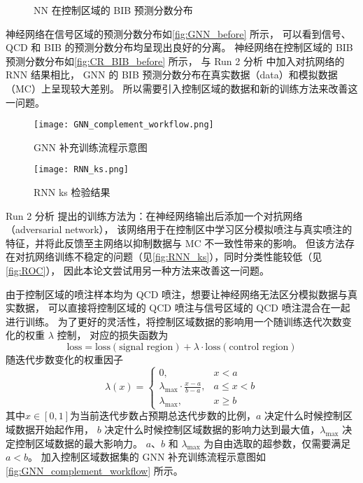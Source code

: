 \begin{figure}[ht]
    \centering
    \hfill
    \caption{NN 在控制区域的 BIB 预测分数分布}
    \label{fig:CR_BIB_before}
\end{figure}

神经网络在信号区域的预测分数分布如\autoref{fig:GNN_before} 所示，
可以看到信号、QCD 和 BIB 的预测分数分布均呈现出良好的分离。
神经网络在控制区域的 BIB 预测分数分布如\autoref{fig:CR_BIB_before} 所示，
与 Run 2 分析\cite{ATLAS:2022zhj} 中加入对抗网络的 RNN 结果相比，
GNN 的 BIB 预测分数分布在真实数据（data）和模拟数据（MC）上呈现较大差别。
所以需要引入控制区域的数据和新的训练方法来改善这一问题。

\begin{figure}[ht]
    \texttt{[image: GNN\_complement\_workflow.png]}
    \caption{GNN 补充训练流程示意图}
    \label{fig:GNN_complement_workflow}
\end{figure}

\begin{figure}[ht]
    \texttt{[image: RNN\_ks.png]}
    \caption{RNN ks 检验结果}
    \label{fig:RNN_ks}
\end{figure}

Run 2 分析\cite{ATLAS:2022zhj} 提出的训练方法为：在神经网络输出后添加一个对抗网络（adversarial network），
该网络用于在控制区中学习区分模拟喷注与真实喷注的特征，并将此反馈至主网络以抑制数据与 MC 不一致性带来的影响。
但该方法存在对抗网络训练不稳定的问题（见\autoref{fig:RNN_ks}），同时分类性能较低（见\autoref{fig:ROC}），
因此本论文尝试用另一种方法来改善这一问题。

由于控制区域的喷注样本均为 QCD 喷注，想要让神经网络无法区分模拟数据与真实数据，
可以直接将控制区域的 QCD 喷注与信号区域的 QCD 喷注混合在一起进行训练。
为了更好的灵活性，将控制区域数据的影响用一个随训练迭代次数变化的权重 $\lambda$ 控制，
对应的损失函数为
\begin{equation}
    \text{loss} = \text{loss}(\text{signal region}) + \lambda \cdot \text{loss}(\text{control region})
\end{equation}
随迭代步数变化的权重因子
\begin{equation}
    \lambda(x) = \begin{cases}
        0,                                    & x < a        \\
        \lambda_{\max} \cdot \frac{x-a}{b-a}, & a \leq x < b \\
        \lambda_{\max},                       & x \geq b
    \end{cases}
\end{equation}
其中$x \in [0, 1]$为当前迭代步数占预期总迭代步数的比例，$a$ 决定什么时候控制区域数据开始起作用，
$b$ 决定什么时候控制区域数据的影响力达到最大值，$\lambda_{\max}$ 决定控制区域数据的最大影响力。
$a$、$b$ 和 $\lambda_{\max}$ 为自由选取的超参数，仅需要满足$a<b$。
加入控制区域数据集的 GNN 补充训练流程示意图如\autoref{fig:GNN_complement_workflow} 所示。


